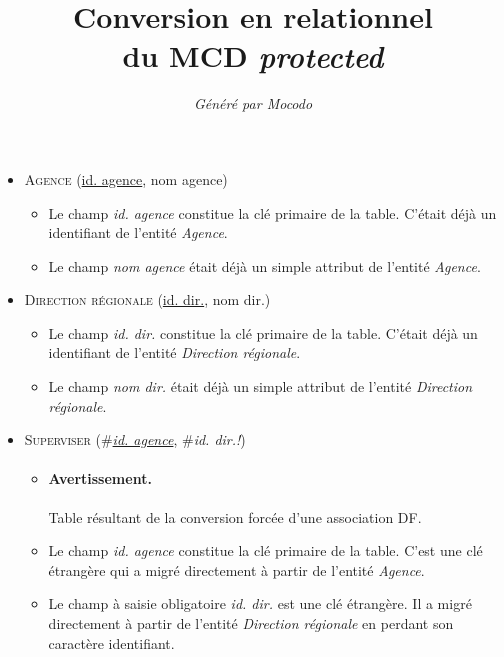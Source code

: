 \documentclass[a4paper]{article}
\title{Conversion en relationnel\\du MCD \emph{protected}}
\author{\emph{Généré par Mocodo}}
\newcommand{\relat}[1]{\textsc{#1}}
\newcommand{\attr}[1]{#1}
\newcommand{\prim}[1]{\uline{#1}}
\newcommand{\foreign}[1]{\#\textsl{#1}}
\begin{document}
\maketitle

\begin{itemize}
  \item \relat{Agence} (\prim{id. agence}, \attr{nom agence})
  \begin{itemize}
    \item Le champ \emph{id. agence} constitue la clé primaire de la table. C'était déjà un identifiant de l'entité \emph{Agence}.
    \item Le champ \emph{nom agence} était déjà un simple attribut de l'entité \emph{Agence}.
  \end{itemize}

  \item \relat{Direction régionale} (\prim{id. dir.}, \attr{nom dir.})
  \begin{itemize}
    \item Le champ \emph{id. dir.} constitue la clé primaire de la table. C'était déjà un identifiant de l'entité \emph{Direction régionale}.
    \item Le champ \emph{nom dir.} était déjà un simple attribut de l'entité \emph{Direction régionale}.
  \end{itemize}

  \item \relat{Superviser} (\foreign{\prim{id. agence}}, \foreign{id. dir.!})
  \begin{itemize}
    \item \paragraph{Avertissement.} Table résultant de la conversion forcée d'une association DF.
    \item Le champ \emph{id. agence} constitue la clé primaire de la table. C'est une clé étrangère qui a migré directement à partir de l'entité \emph{Agence}.
    \item Le champ à saisie obligatoire \emph{id. dir.} est une clé étrangère. Il a migré directement à partir de l'entité \emph{Direction régionale} en perdant son caractère identifiant.
  \end{itemize}

\end{itemize}
\end{document}

